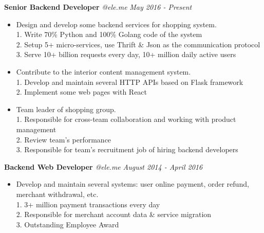 ﻿\documentclass[9pt]{article}
\newenvironment{changemargin}[2]{%
  \begin{list}{}{%
    \setlength{\topsep}{0pt}%
    \setlength{\leftmargin}{#1}%
    \setlength{\rightmargin}{#2}%
    \setlength{\listparindent}{\parindent}%
    \setlength{\itemindent}{\parindent}%
    \setlength{\parsep}{\parskip}%
  }%
  \item[]}{\end{list}
}
\newenvironment{body} {
	\vspace*{-16pt}
	\begin{changemargin}{-0.25in}{-0.5in}
  }
	{\end{changemargin}
}
\begin{document}
\begin{body}
	\vspace{14pt}

    \textbf{Senior Backend Developer} \emph{@ele.me} \hfill \emph{May 2016 - Present}\\
    \vspace*{-4pt}
    \begin{itemize} \itemsep -0pt  %
        \item Design and develop some backend services for shopping system.\\
        1. Write 70\% Python and 100\% Golang code of the system\\
        2. Setup 5+ micro-services, use Thrift \& Json as the communication protocol\\
        3. Serve 10+ billion requests every day, 10+ million daily active users\\
        \item Contribute to the interior content management system.\\
        1. Develop and maintain several HTTP APIs based on Flask framework\\
        2. Implement some web pages with React\\
        \item Team leader of shopping group.\\
        1. Responsible for cross-team collaboration and working with product management\\
        2. Review team's performance\\
        3. Responsible for team's recruitment job of hiring backend developers\\
    \end{itemize}

    \textbf{Backend Web Developer} \emph{@ele.me} \hfill \emph{August 2014 - April 2016}\\
    \vspace*{-4pt}
    \begin{itemize} \itemsep -0pt  %
        \item Develop and maintain several systems: user online payment, order refund, merchant withdrawal, etc.\\
        1. 3+ million payment transactions every day\\
        2. Responsible for merchant account data \& service migration\\
        3. Outstanding Employee Award\\
    \end{itemize}


\end{body}
\end{document}
